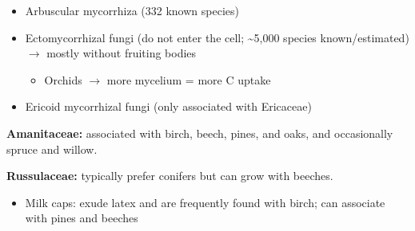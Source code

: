 \begin{itemize}
  \item Arbuscular mycorrhiza (332 known species)
\end{itemize}
\begin{imagerow}
   \hfill
\end{imagerow}

\begin{itemize}
  \item Ectomycorrhizal fungi (do not enter the cell; \textasciitilde5,000 species known/estimated) $\rightarrow$ mostly without fruiting bodies
  \begin{itemize}
    \item Orchids $\rightarrow$ more mycelium = more C uptake
  \end{itemize}
\end{itemize}
\begin{imagerow}
   \hfill
   \hfill
\end{imagerow}

\begin{itemize}
  \item Ericoid mycorrhizal fungi (only associated with Ericaceae)
\end{itemize}
\begin{imagerow}
   \hfill
\end{imagerow}

\textbf{Amanitaceae:} associated with birch, beech, pines, and oaks, and occasionally spruce and willow.
\begin{imagerow}
   \hfill
   \hfill
\end{imagerow}

\textbf{Russulaceae:} typically prefer conifers but can grow with beeches.
\begin{itemize}
  \item Milk caps: exude latex and are frequently found with birch; can associate with pines and beeches
\end{itemize}
\begin{imagerow}
   \hfill
   \hfill
\end{imagerow}

